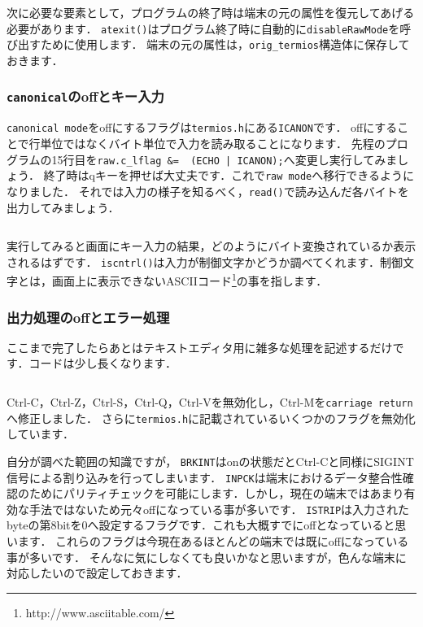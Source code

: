 次に必要な要素として，プログラムの終了時は端末の元の属性を復元してあげる必要があります．
\texttt{atexit()}はプログラム終了時に自動的に\texttt{disableRawMode}を呼び出すために使用します．
端末の元の属性は，\texttt{orig_termios}構造体に保存しておきます．

\subsubsection{\texttt{canonical}のoffとキー入力}
\texttt{canonical mode}をoffにするフラグは\texttt{termios.h}にある\texttt{ICANON}です．
offにすることで行単位ではなくバイト単位で入力を読み取ることになります．
先程のプログラムの15行目を\texttt{raw.c_lflag &= ~(ECHO | ICANON);}へ変更し実行してみましょう．
終了時はqキーを押せば大丈夫です．これで\texttt{raw mode}へ移行できるようになりました．
それでは入力の様子を知るべく，\texttt{read()}で読み込んだ各バイトを出力してみましょう．
\inputminted[frame=lines,framesep=2mm,baselinestretch=1.2,fontsize=\footnotesize,linenos,breaklines]{c}{\takuzooasset/step1_3.c}
実行してみると画面にキー入力の結果，どのようにバイト変換されているか表示されるはずです．
\texttt{iscntrl()}は入力が制御文字かどうか調べてくれます．制御文字とは，画面上に表示できないASCIIコード\footnote{http://www.asciitable.com/}の事を指します．

\subsubsection{出力処理のoffとエラー処理}
ここまで完了したらあとはテキストエディタ用に雑多な処理を記述するだけです．コードは少し長くなります．
\inputminted[frame=lines,framesep=2mm,baselinestretch=1.2,fontsize=\footnotesize,linenos,breaklines]{c}{\takuzooasset/step1_4.c}
Ctrl-C，Ctrl-Z，Ctrl-S，Ctrl-Q，Ctrl-Vを無効化し，Ctrl-Mを\texttt{carriage return}へ修正しました．
さらに\texttt{termios.h}に記載されているいくつかのフラグを無効化しています．

自分が調べた範囲の知識ですが，
\texttt{BRKINT}はonの状態だとCtrl-Cと同様にSIGINT信号による割り込みを行ってしまいます．
\texttt{INPCK}は端末におけるデータ整合性確認のためにパリティチェックを可能にします．しかし，現在の端末ではあまり有効な手法ではないため元々offになっている事が多いです．
\texttt{ISTRIP}は入力されたbyteの第8bitを0へ設定するフラグです．これも大概すでにoffとなっていると思います．
これらのフラグは今現在あるほとんどの端末では既にoffになっている事が多いです．
そんなに気にしなくても良いかなと思いますが，色んな端末に対応したいので設定しておきます．

